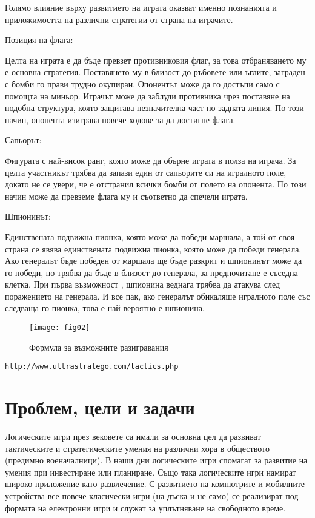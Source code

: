 Голямо влияние върху развитието на играта оказват именно познанията и приложимостта  на различни стратегии от страна на играчите.

Позиция на флага:

Целта на играта е да бъде превзет противниковия флаг, за това отбраняването му е основна стратегия. Поставянето му в близост до ръбовете или ъглите, заграден с бомби го прави трудно  окупиран. Опонентът може да го достъпи само с помощта на миньор. Играчът може да  заблуди противника чрез поставяне на подобна структура, която защитава незначителна част по задната линия. По този начин, опонента изиграва повече ходове за да достигне флага.

Сапьорът:

Фигурата с най-висок ранг, която може да обърне играта в полза на играча. За целта участникът трябва да запази един от сапьорите си на игралното поле, докато не се увери, че е отстранил всички бомби от полето на опонента. По този начин може да превземе флага му и съответно да спечели играта.

Шпионинът:

Единствената подвижна пионка, която може да победи маршала, а той от своя страна се явява единствената подвижна пионка, която може да победи генерала. Ако генералът бъде победен от маршала ще бъде разкрит и шпионинът може да го победи, но трябва да бъде в близост до генерала, за предпочитане е съседна клетка. При първа възможност , шпионина веднага трябва  да атакува след поражението на генерала. И все пак, ако генералът обикаляше игралното поле със следваща го пионка, това е най-вероятно е шпионина.

\begin{figure}[h!]
 \centering
 \texttt{[image: fig02]}
 \caption{Формула за възможните разигравания \cite{arts01}}
\label{figure02}
\end{figure}
\FloatBarrier

\begin{lstlisting}
http://www.ultrastratego.com/tactics.php
\end{lstlisting}

\section{Проблем, цели и задачи}

Логическите игри през вековете са имали за основна цел да развиват тактическите и стратегическите умения на различни хора в обществото (предимно военачалници). В наши дни логическите игри спомагат за развитие на умения при инвестиране или планиране. Също така логическите игри намират широко приложение като развлечение. С развитието на компютрите и мобилните устройства все повече класически игри (на дъска и не само) се реализират под формата на електронни игри и служат за уплътняване на свободното време. 


